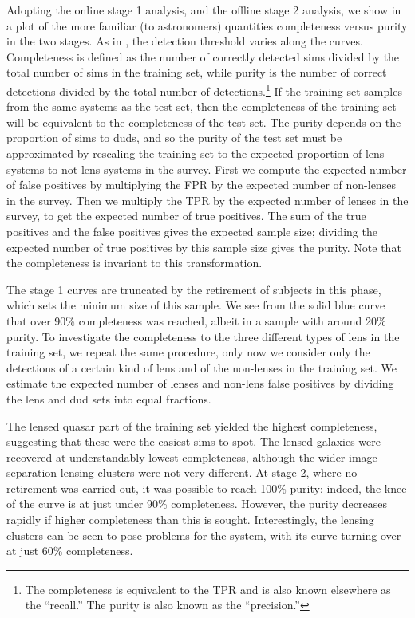 \documentclass[useAMS,usenatbib,a4paper]{mn2e}
\begin{document}
Adopting the online stage 1 analysis, and the offline stage 2 analysis, we
show in  a plot of the more familiar (to
astronomers) quantities completeness versus purity in
the two stages. As in , the detection threshold
varies along the curves. Completeness is defined as the number of correctly
detected sims divided by the total number of sims in the training set, while
purity is the number of correct detections divided by the total number of
detections.\footnote{The completeness is equivalent to the TPR and is also
known elsewhere as the ``recall.''  The purity is also known as the
``precision.''} If the training set samples from the same systems as the test
set, then the completeness of the training set will be equivalent to the
completeness of the test set. The purity depends on the proportion of sims to
duds, and so the purity of the test set must be approximated by rescaling the
training set to the expected proportion of lens systems to not-lens systems in
the survey. First we compute the expected number of false positives by
multiplying the FPR by the expected number of non-lenses in the survey. Then
we multiply the TPR by the expected number of lenses in the survey, to get the
expected number of true positives. The sum of the true positives and the false
positives gives the expected sample size; dividing the expected number of true
positives by this sample size gives the purity. Note that the completeness is
invariant to this transformation.

The stage 1 curves are truncated by the retirement of subjects in this phase, 
which sets the minimum size of this sample. We see from the solid blue curve
that over 90\% completeness was reached, albeit in a sample with around 20\%
purity. To investigate the completeness to the three different types of lens
in the training set, we repeat the same procedure, only now we consider only
the detections of a certain kind of lens and of the non-lenses in the training
set. We estimate the expected number of lenses and non-lens false positives by
dividing the lens and dud sets into equal fractions.


The lensed quasar part of the training set yielded the highest
completeness, suggesting that these were the easiest sims to spot. The lensed
galaxies were recovered at understandably lowest completeness, although the
wider image separation  lensing clusters were not very different. At stage 2,
where no retirement was carried out, it was possible to reach 100\% purity:
indeed, the knee of the curve is at just under 90\% completeness. However, the
purity decreases rapidly if higher completeness than this is sought.
Interestingly, the lensing clusters can be seen to pose problems for the
system, with its curve turning over at just 60\% completeness.
\end{document}
